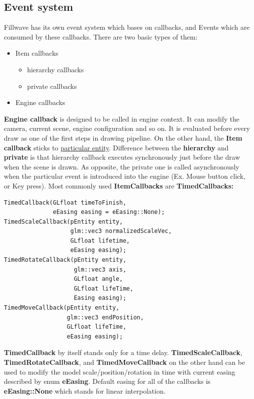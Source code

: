 \documentclass{article}
\begin{document}
\newpage
\subsection{Event system}\label{sec:Event system}
\indent \indent Fillwave has its own event system which bases on callbacks, and Events which are consumed by these callbacks. There are two basic types of them:
\begin{itemize}
\item Item callbacks
\begin{itemize}
\item hierarchy callbacks
\item private callbacks
\end{itemize}
\item Engine callbacks
\end{itemize}

\indent \indent \textbf{Engine callback} is designed to be called in engine context. It can modify the camera, current scene, engine configuration and so on. It is evaluated before every draw as one of the first steps in drawing pipeline. On the other hand, the \textbf{Item callback} sticks to \underline{particular entity}. Difference between the \textbf{hierarchy} and \textbf{private} is that hierarchy callback executes synchronously just before the draw when the scene is drawn. As opposite, the private one is called asynchronously when the particular event is introduced into the engine (Ex. Mouse button click, or Key press). Most commonly used \textbf{ItemCallbacks} are \textbf{TimedCallbacks:}

\begin{lstlisting}
TimedCallback(GLfloat timeToFinish,
              eEasing easing = eEasing::None);
TimedScaleCallback(pEntity entity,
                   glm::vec3 normalizedScaleVec,
                   GLfloat lifetime,
                   eEasing easing);
TimedRotateCallback(pEntity entity,
                    glm::vec3 axis,
                    GLfloat angle,
                    GLfloat lifeTime,
                    Easing easing);
TimedMoveCallback(pEntity entity,
                  glm::vec3 endPosition,
                  GLfloat lifeTime,
                  eEasing easing);
\end{lstlisting}

\indent \indent \textbf{TimedCallback} by itself stands only for a time delay. \textbf{TimedScaleCallback}, \textbf{TimedRotateCallback}, and \textbf{TimedMoveCallback} on the other hand can be used to modify the model scale/position/rotation in time with current easing described by enum \textbf{eEasing}. Default easing for all of the callbacks is \textbf{eEasing::None} which stands for linear interpolation.
\newpage
\end{document}
